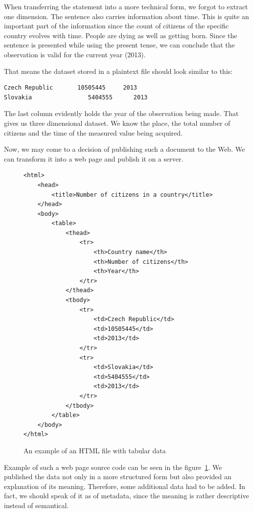 When transferring the statement into a more technical form, we forgot to extract one
dimension. The sentence also carries information about time. This is quite an important
part of the information since the count of citizens of the specific country evolves with time.
People are dying as well as getting born. Since the sentence is presented while using the
present tense, we can conclude that the observation is valid for the current year (2013).

That means the dataset stored in a plaintext file should look similar to this:

\begin{verbatim}
Czech Republic       10505445     2013
Slovakia	            5404555      2013
\end{verbatim}

The last column evidently holds the year of the observation being made.
That gives us three dimensional dataset. We know the place, the total number of
citizens and the time of the measured value being acquired.

Now, we may come to a decision of publishing such a document to the Web. We can transform
it into a web page and publish it on a server.
\begin{figure}
\small\begin{verbatim}
<html>
    <head>
        <title>Number of citizens in a country</title>
    </head>
    <body>
        <table>
            <thead>
                <tr>
                    <th>Country name</th>
                    <th>Number of citizens</th>
                    <th>Year</th>
                </tr>
            </thead>
            <tbody>
                <tr>
                    <td>Czech Republic</td>
                    <td>10505445</td>
                    <td>2013</td>
                </tr>
                <tr>
                    <td>Slovakia</td>
                    <td>5404555</td>
                    <td>2013</td>
                </tr>
            </tbody>
        </table>
    </body>
</html>
\end{verbatim}\normalsize
\label{fig:rdf-html-01}
\caption{An example of an HTML file with tabular data}
\end{figure}

Example of such a web page source code can be seen in the 
figure~\ref{fig:rdf-html-01}. We published the data not only in a more structured form but also
provided an explanation of its meaning. Therefore, some additional data had to be added. In fact, we
should speak of it as of metadata, since the meaning is rather descriptive instead of semantical.

